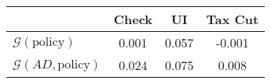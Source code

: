 \begin{tabular}{@{}lccc@{}} 
\toprule 
                          & Check      & UI    & Tax Cut    \\  \midrule 
$\mathcal{G}(\text{policy})$ & 0.001  & 0.057  & -0.001     \\ 
$\mathcal{G}(AD,\text{policy})$ & 0.024  & 0.075  & 0.008     \\ 
\end{tabular}  
